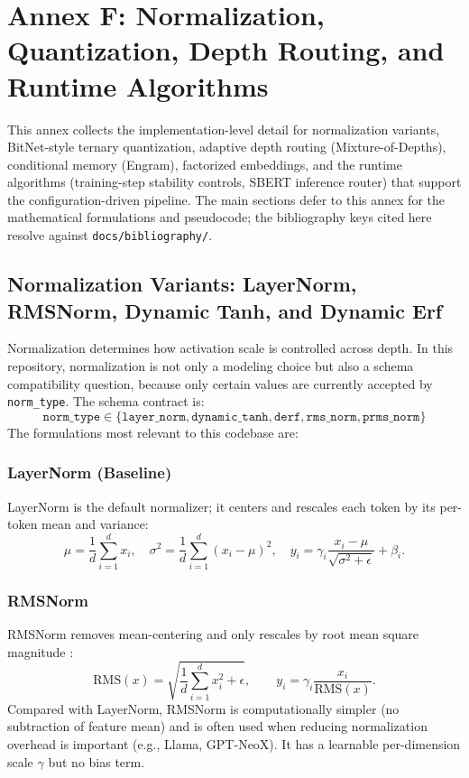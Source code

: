 \section{Annex F: Normalization, Quantization, Depth Routing, and Runtime Algorithms}
\label{sec:annex-norm-bitnet-mod}

This annex collects the implementation-level detail for normalization variants, BitNet-style ternary quantization, adaptive depth routing (Mixture-of-Depths), conditional memory (Engram), factorized embeddings, and the runtime algorithms (training-step stability controls, SBERT inference router) that support the configuration-driven pipeline. The main sections defer to this annex for the mathematical formulations and pseudocode; the bibliography keys cited here resolve against \texttt{docs/bibliography/}.

\subsection{Normalization Variants: LayerNorm, RMSNorm, Dynamic Tanh, and Dynamic Erf}

Normalization determines how activation scale is controlled across depth. In this repository, normalization is not only a modeling choice but also a schema compatibility question, because only certain values are currently accepted by \texttt{norm\_type}. The schema contract is:
\[
\texttt{norm\_type} \in \{\texttt{layer\_norm}, \texttt{dynamic\_tanh}, \texttt{derf}, \texttt{rms\_norm}, \texttt{prms\_norm}\}
\]
The formulations most relevant to this codebase are:

\subsubsection{LayerNorm (Baseline)}
LayerNorm \citep{ba2016layer} is the default normalizer; it centers and rescales each token by its per-token mean and variance:
\[
\mu = \frac{1}{d}\sum_{i=1}^{d} x_i, \quad \sigma^2 = \frac{1}{d}\sum_{i=1}^{d}(x_i - \mu)^2, \quad y_i = \gamma_i \frac{x_i - \mu}{\sqrt{\sigma^2 + \epsilon}} + \beta_i.
\]

\subsubsection{RMSNorm}
RMSNorm removes mean-centering and only rescales by root mean square magnitude \citep{zhang_root_2019}:
\[
\mathrm{RMS}(x)=\sqrt{\frac{1}{d}\sum_{i=1}^{d}x_i^2+\epsilon},\qquad
y_i=\gamma_i\frac{x_i}{\mathrm{RMS}(x)}.
\]
Compared with LayerNorm, RMSNorm is computationally simpler (no subtraction of feature mean) and is often used when reducing normalization overhead is important (e.g., Llama, GPT-NeoX). It has a learnable per-dimension scale $\gamma$ but no bias term.

